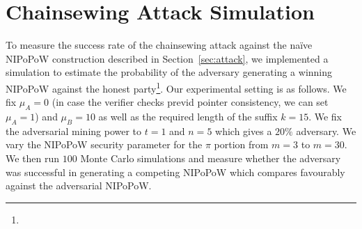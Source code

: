 \section{Chainsewing Attack Simulation}
\label{sec:simulation}

To measure the success rate of the chainsewing attack against the na\"ive NIPoPoW construction described in Section~\ref{sec:attack}, we implemented a simulation to estimate the probability of the adversary generating a winning NIPoPoW against the honest party\footnote{\fi}. Our experimental setting is as follows. We fix $\mu_A = 0$ (in case the verifier checks previd pointer consistency, we can set $\mu_A = 1$) and $\mu_B = 10$ as well as the required length of the suffix $k = 15$. We fix the adversarial mining power to $t = 1$ and $n = 5$ which gives a $20\%$ adversary. We   vary the NIPoPoW security parameter for the $\pi$ portion from $m = 3$ to $m = 30$. We then run $100$ Monte Carlo simulations and measure whether the adversary was successful in generating a competing NIPoPoW which compares favourably against the adversarial NIPoPoW.

